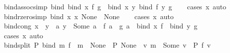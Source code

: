 \begin{isabellebody}
%
\isadelimproof
\isanewline
%
\endisadelimproof
\isanewline
{}\isamarkupfalse%
\ bind{\isacharunderscore}{\kern0pt}assoc{\isacharbrackleft}{\kern0pt}simp{\isacharbrackright}{\kern0pt}{\isacharcolon}{\kern0pt}\ {\isachardoublequoteopen}bind\ {\isacharparenleft}{\kern0pt}bind\ x\ f{\isacharparenright}{\kern0pt}\ g\ {\isacharequal}{\kern0pt}\ bind\ x\ {\isacharparenleft}{\kern0pt}{\isasymlambda}y{\isachardot}{\kern0pt}\ bind\ {\isacharparenleft}{\kern0pt}f\ y{\isacharparenright}{\kern0pt}\ g{\isacharparenright}{\kern0pt}{\isachardoublequoteclose}\isanewline
%
\isadelimproof
\ \ %
\endisadelimproof
%
\isatagproof
{}\isamarkupfalse%
\ {\isacharparenleft}{\kern0pt}cases\ x{\isacharparenright}{\kern0pt}\ auto%
\endisatagproof
{\isafoldproof}%
%
\isadelimproof
\isanewline
%
\endisadelimproof
\isanewline
{}\isamarkupfalse%
\ bind{\isacharunderscore}{\kern0pt}rzero{\isacharbrackleft}{\kern0pt}simp{\isacharbrackright}{\kern0pt}{\isacharcolon}{\kern0pt}\ {\isachardoublequoteopen}bind\ x\ {\isacharparenleft}{\kern0pt}{\isasymlambda}x{\isachardot}{\kern0pt}\ None{\isacharparenright}{\kern0pt}\ {\isacharequal}{\kern0pt}\ None{\isachardoublequoteclose}\isanewline
%
\isadelimproof
\ \ %
\endisadelimproof
%
\isatagproof
{}\isamarkupfalse%
\ {\isacharparenleft}{\kern0pt}cases\ x{\isacharparenright}{\kern0pt}\ auto\isanewline
\isanewline
{}%
\endisatagproof
{\isafoldproof}%
%
\isadelimproof
%
\endisadelimproof
\ \isamarkupfalse%
\ bind{\isacharunderscore}{\kern0pt}cong{\isacharcolon}{\kern0pt}\ {\isachardoublequoteopen}x\ {\isacharequal}{\kern0pt}\ y\ {\isasymLongrightarrow}\ {\isacharparenleft}{\kern0pt}{\isasymAnd}a{\isachardot}{\kern0pt}\ y\ {\isacharequal}{\kern0pt}\ Some\ a\ {\isasymLongrightarrow}\ f\ a\ {\isacharequal}{\kern0pt}\ g\ a{\isacharparenright}{\kern0pt}\ {\isasymLongrightarrow}\ bind\ x\ f\ {\isacharequal}{\kern0pt}\ bind\ y\ g{\isachardoublequoteclose}\isanewline
%
\isadelimproof
\ \ %
\endisadelimproof
%
\isatagproof
{}\isamarkupfalse%
\ {\isacharparenleft}{\kern0pt}cases\ x{\isacharparenright}{\kern0pt}\ auto%
\endisatagproof
{\isafoldproof}%
%
\isadelimproof
\isanewline
%
\endisadelimproof
\isanewline
{}\isamarkupfalse%
\ bind{\isacharunderscore}{\kern0pt}split{\isacharcolon}{\kern0pt}\ {\isachardoublequoteopen}P\ {\isacharparenleft}{\kern0pt}bind\ m\ f{\isacharparenright}{\kern0pt}\ {\isasymlongleftrightarrow}\ {\isacharparenleft}{\kern0pt}m\ {\isacharequal}{\kern0pt}\ None\ {\isasymlongrightarrow}\ P\ None{\isacharparenright}{\kern0pt}\ {\isasymand}\ {\isacharparenleft}{\kern0pt}{\isasymforall}v{\isachardot}{\kern0pt}\ m\ {\isacharequal}{\kern0pt}\ Some\ v\ {\isasymlongrightarrow}\ P\ {\isacharparenleft}{\kern0pt}f\ v{\isacharparenright}{\kern0pt}{\isacharparenright}{\kern0pt}{\isachardoublequoteclose}\isanewline

\end{isabellebody}

